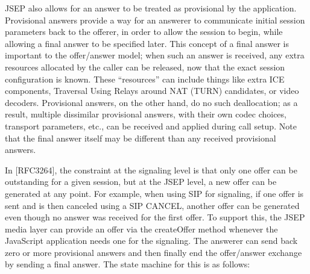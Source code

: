 \documentclass{article}
\begin{document}
JSEP also allows for an answer to be treated as provisional by the
application.  Provisional answers provide a way for an answerer to
communicate initial session parameters back to the offerer, in order
to allow the session to begin, while allowing a final answer to be
specified later.  This concept of a final answer is important to the
offer/answer model; when such an answer is received, any extra
resources allocated by the caller can be released, now that the exact
session configuration is known.  These ``resources'' can include things
like extra ICE components, Traversal Using Relays around NAT (TURN)
candidates, or video decoders.  Provisional answers, on the other
hand, do no such deallocation; as a result, multiple dissimilar
provisional answers, with their own codec choices, transport
parameters, etc., can be received and applied during call setup.
Note that the final answer itself may be different than any received
provisional answers.

In [RFC3264], the constraint at the signaling level is that only one
offer can be outstanding for a given session, but at the JSEP level,
a new offer can be generated at any point.  For example, when using
SIP for signaling, if one offer is sent and is then canceled using a
SIP CANCEL, another offer can be generated even though no answer was
received for the first offer.  To support this, the JSEP media layer
can provide an offer via the createOffer method whenever the
JavaScript application needs one for the signaling.  The answerer can
send back zero or more provisional answers and then finally end the
offer/answer exchange by sending a final answer.  The state machine
for this is as follows:
\end{document}
